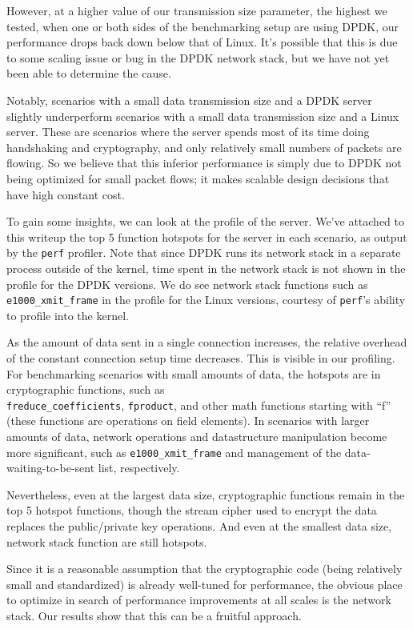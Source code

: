 \documentclass{sig-alternate-05-2015}
\begin{document}
However, at a higher value of our transmission size parameter, the highest we tested,
when one or both sides of the benchmarking setup are using DPDK,
our performance drops back down below that of Linux.
It's possible that this is due to some scaling issue or bug in the DPDK network stack,
but we have not yet been able to determine the cause.

Notably, scenarios with a small data transmission size and a DPDK server
slightly underperform scenarios with a small data transmission size and a Linux server.
These are scenarios where the server spends most of its time doing handshaking and cryptography,
and only relatively small numbers of packets are flowing.
So we believe that this inferior performance is simply due to DPDK not being optimized for small packet flows;
it makes scalable design decisions that have high constant cost.

To gain some insights, we can look at the profile of the server.
We've attached to this writeup the top 5 function hotspots for the server in each scenario,
as output by the \texttt{perf} profiler.
Note that since DPDK runs its network stack in a separate process outside of the kernel,
time spent in the network stack is not shown in the profile for the DPDK versions.
We do see network stack functions such as \verb|e1000_xmit_frame| in the profile for the Linux versions,
courtesy of \texttt{perf}'s ability to profile into the kernel.

As the amount of data sent in a single connection increases,
the relative overhead of the constant connection setup time decreases.
This is visible in our profiling.
For benchmarking scenarios with small amounts of data, the hotspots are in cryptographic functions,
such as \\
\verb|freduce_coefficients|, \verb|fproduct|, and other math functions starting with ``f''
(these functions are operations on field elements).
In scenarios with larger amounts of data,
network operations and datastructure manipulation become more significant,
such as \verb|e1000_xmit_frame| and management of the data-waiting-to-be-sent list, respectively.

Nevertheless, even at the largest data size,
cryptographic functions remain in the top 5 hotspot functions,
though the stream cipher used to encrypt the data replaces the public/private key operations.
And even at the smallest data size,
network stack function are still hotspots.

Since it is a reasonable assumption that the cryptographic code 
(being relatively small and standardized)
is already well-tuned for performance,
the obvious place to optimize in search of performance improvements at all scales is the network stack.
Our results show that this can be a fruitful approach.
\end{document}
